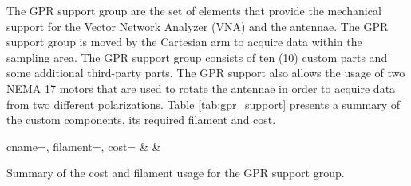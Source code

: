 \documentclass{article}
\begin{document}
The GPR support group are the set of elements that provide the mechanical support for the Vector Network Analyzer (VNA) and the antennae. The GPR support group is moved by the Cartesian arm to acquire data within the sampling area. The GPR support group consists of ten (10) custom parts and some additional third-party parts. The GPR support also allows the usage of two NEMA 17 motors that are used to rotate the antennae in order to acquire data from two different polarizations. Table \ref{tab:gpr_support} presents a summary of the custom components, its required filament and cost.

\begin{table}[h]
    \centering
    {cname=\cname, filament=\filament, cost=\cost}%
    {\cname & \filament & \cost}%
    \caption{Summary of the cost and filament usage for the GPR support group.}
    \label{tab:gpr_support}
\end{table}


\clearpage

\end{document}
